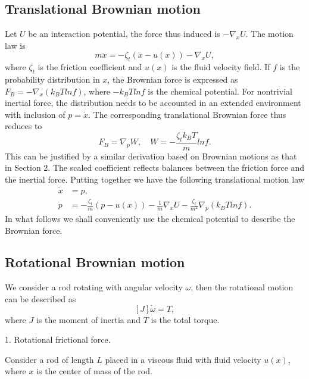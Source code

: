 \documentclass[reqno]{amsart}
\numberwithin{equation}{section}
\theoremstyle{definition}
\theoremstyle{remark}
\begin{document}
\subsection{Translational Brownian motion}
Let $U$ be an interaction potential, the force thus  induced is $-\nabla_xU$. The motion law is
$$
m\ddot{x}=-\zeta_t(\dot x -u(x))-\nabla_x U,
$$
where $\zeta_t$ is the friction coefficient and $u(x)$ is the fluid
velocity field. If $f$ is the probability distribution in $x$, the
Brownian force is expressed as $F_B=-\nabla_x (k_BT ln f)$, where
$-k_BTln f$ is the chemical potential. For nontrivial inertial
force, the distribution needs to be accounted in an extended
environment with inclusion of $p=\dot x$. The corresponding
translational Brownian force thus reduces to
\begin{equation}\label{cp}
F_B=\nabla_p W, \quad W=-\frac{\zeta_t k_B T}{m}ln f .
\end{equation}
This can be justified by a similar derivation based on Brownian
motions as that in Section 2. The scaled coefficient reflects
balances between the friction force and the inertial force. Putting
together we have the following translational motion law
\begin{align}
\dot x &=p, \\
\dot p &= -\frac{\zeta_t}{m}(p-u(x)) -\frac{1}{m}\nabla_x U-\frac{\zeta_t }{m^2} \nabla_p (k_B Tln f).
\end{align}
In what follows we shall conveniently use the chemical potential to describe the Brownian force.

\subsection{Rotational Brownian motion}
We consider a rod rotating with angular velocity $\omega$, then the rotational motion can be described as
$$
[J]\dot \omega =T,
$$
where $J$ is the moment of inertia and $T$ is the total torque.

1. Rotational frictional force.

Consider a rod of length $L$  placed in a viscous fluid with fluid
velocity $u(x)$, where $x$ is the center of mass of the rod.
\end{document}

